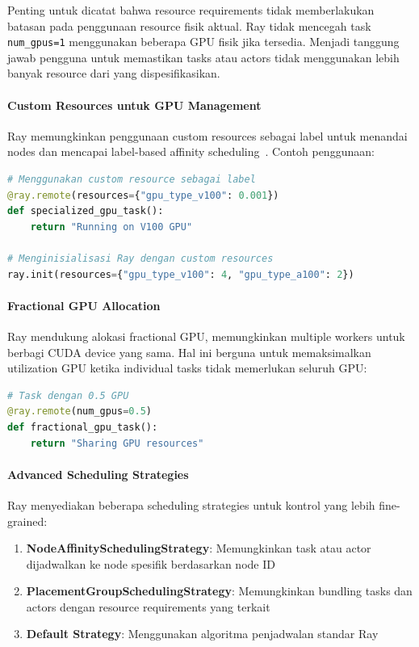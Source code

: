 Penting untuk dicatat bahwa resource requirements tidak memberlakukan batasan pada penggunaan resource fisik aktual. Ray tidak mencegah task \texttt{num\_gpus=1} menggunakan beberapa GPU fisik jika tersedia. Menjadi tanggung jawab pengguna untuk memastikan tasks atau actors tidak menggunakan lebih banyak resource dari yang dispesifikasikan.

\paragraph{Custom Resources untuk GPU Management}

Ray memungkinkan penggunaan custom resources sebagai label untuk menandai nodes dan mencapai label-based affinity scheduling~\citep{RayCustomResources2019}. Contoh penggunaan:

\begin{lstlisting}[language=Python]
# Menggunakan custom resource sebagai label
@ray.remote(resources={"gpu_type_v100": 0.001})
def specialized_gpu_task():
    return "Running on V100 GPU"

# Menginisialisasi Ray dengan custom resources
ray.init(resources={"gpu_type_v100": 4, "gpu_type_a100": 2})
\end{lstlisting}

\paragraph{Fractional GPU Allocation}

Ray mendukung alokasi fractional GPU, memungkinkan multiple workers untuk berbagi CUDA device yang sama. Hal ini berguna untuk memaksimalkan utilization GPU ketika individual tasks tidak memerlukan seluruh GPU:

\begin{lstlisting}[language=Python]
# Task dengan 0.5 GPU
@ray.remote(num_gpus=0.5)
def fractional_gpu_task():
    return "Sharing GPU resources"
\end{lstlisting}

\paragraph{Advanced Scheduling Strategies}

Ray menyediakan beberapa scheduling strategies untuk kontrol yang lebih fine-grained:

\begin{enumerate}
\item \textbf{NodeAffinitySchedulingStrategy}: Memungkinkan task atau actor dijadwalkan ke node spesifik berdasarkan node ID
\item \textbf{PlacementGroupSchedulingStrategy}: Memungkinkan bundling tasks dan actors dengan resource requirements yang terkait
\item \textbf{Default Strategy}: Menggunakan algoritma penjadwalan standar Ray
\end{enumerate}

